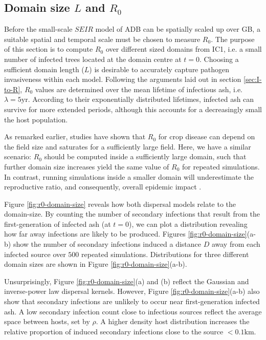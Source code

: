 \subsection{Domain size $L$ and $R_0$}
\label{sec:r0-vs-L}

Before the small-scale $SEIR$ model of ADB can be spatially scaled up over GB, a suitable spatial and temporal 
scale must be chosen to measure $R_0$. The purpose of this section is to compute $R_0$ over different sized 
domains from IC1, i.e. a small number of infected trees located at the domain centre at $t=0$.
Choosing a sufficient domain length ($L$) is desirable to accurately capture pathogen invasiveness within each model.
Following the arguments laid out in section \ref{sec:I-to-R}, $R_0$ values are determined over the mean 
lifetime of infectious ash, i.e. $\lambda=5\mathrm{yr}$. According to their exponentially distributed lifetimes, 
infected ash can survive for more extended periods, although this accounts for a decreasingly small  the host population.

As remarked earlier, studies have shown that $R_0$ for crop disease can depend on the field size \cite{mikaberidze2016invasiveness} 
and saturates for a sufficiently large field. Here, we have a similar scenario: $R_0$ should be computed inside a sufficiently large domain,
such that further domain size increases yield the same value of $R_0$ for repeated simulations. In contrast, running simulations inside a smaller domain will 
underestimate the reproductive ratio, and consequently, overall epidemic impact \cite{R0-perc-ref, time-varying-infectivity}.

Figure \ref{fig:r0-domain-size} reveals how both dispersal models relate to the domain-size.
By counting the number of secondary infections that result from the first-generation of infected ash (at $t=0$), we can plot a distribution revealing how far away infections are likely to be produced.
Figures \ref{fig:r0-domain-size}(a-b) show the number of secondary infections induced a distance $D$ away from each infected source over $500$ repeated simulations.
Distributions for three different domain sizes are shown in Figure \ref{fig:r0-domain-size}(a-b).

Unsurprisingly, Figure \ref{fig:r0-domain-size}(a) and (b) reflect the Gaussian and inverse-power law dispersal kernels. 
However, Figure \ref{fig:r0-domain-size}(a-b) also show that secondary infections are unlikely to occur near first-generation infected ash.
A low secondary infection count close to infectious sources reflect the average space between hosts, set by $\rho$.
A higher density host distribution increases the relative proportion of induced secondary infections close to the source $<0.1\mathrm{km}$.

